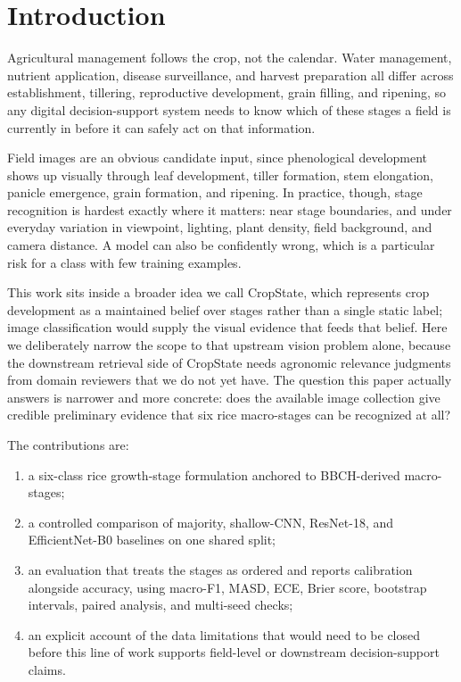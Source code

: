\documentclass{llncs}
\begin{document}
\section{Introduction}

Agricultural management follows the crop, not the calendar. Water management, nutrient application, disease surveillance, and harvest preparation all differ across establishment, tillering, reproductive development, grain filling, and ripening, so any digital decision-support system needs to know which of these stages a field is currently in before it can safely act on that information.

Field images are an obvious candidate input, since phenological development shows up visually through leaf development, tiller formation, stem elongation, panicle emergence, grain formation, and ripening. In practice, though, stage recognition is hardest exactly where it matters: near stage boundaries, and under everyday variation in viewpoint, lighting, plant density, field background, and camera distance. A model can also be confidently wrong, which is a particular risk for a class with few training examples.

This work sits inside a broader idea we call CropState, which represents crop development as a maintained belief over stages rather than a single static label; image classification would supply the visual evidence that feeds that belief. Here we deliberately narrow the scope to that upstream vision problem alone, because the downstream retrieval side of CropState needs agronomic relevance judgments from domain reviewers that we do not yet have. The question this paper actually answers is narrower and more concrete: does the available image collection give credible preliminary evidence that six rice macro-stages can be recognized at all?

The contributions are:
\begin{enumerate}
    \item a six-class rice growth-stage formulation anchored to BBCH-derived macro-stages;
    \item a controlled comparison of majority, shallow-CNN, ResNet-18, and EfficientNet-B0 baselines on one shared split;
    \item an evaluation that treats the stages as ordered and reports calibration alongside accuracy, using macro-F1, MASD, ECE, Brier score, bootstrap intervals, paired analysis, and multi-seed checks;
    \item an explicit account of the data limitations that would need to be closed before this line of work supports field-level or downstream decision-support claims.
\end{enumerate}
\end{document}
